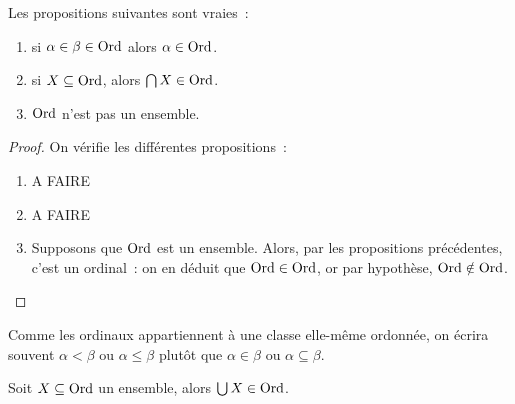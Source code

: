 \begin{proposition}
  Les propositions suivantes sont vraies~:
  \begin{enumerate}
  \item si $\alpha \in \beta \in \operatorname{Ord}$ alors $\alpha \in \operatorname{Ord}$.
  \item si $X\subseteq \operatorname{Ord}$, alors $\bigcap X \in \operatorname{Ord}$.
  \item $\operatorname{Ord}$ n'est pas un ensemble.
  \end{enumerate}
\end{proposition}

\begin{proof}
  On vérifie les différentes propositions~:
  \begin{enumerate}
  \item A FAIRE
  \item A FAIRE
  \item Supposons que $\operatorname{Ord}$ est un ensemble. Alors, par les propositions
    précédentes, c'est un ordinal~: on en déduit que $\operatorname{Ord}\in\operatorname{Ord}$, or par
    hypothèse, $\operatorname{Ord}\notin\operatorname{Ord}$.
  \end{enumerate}
\end{proof}

\begin{notation}
  Comme les ordinaux appartiennent à une classe elle-même ordonnée, on écrira
  souvent $\alpha < \beta$ ou $\alpha \leq \beta$ plutôt que $\alpha \in \beta$
  ou $\alpha \subseteq \beta$.
\end{notation}

\begin{property}
  Soit $X\subseteq\operatorname{Ord}$ un ensemble, alors $\bigcup X \in \operatorname{Ord}$.
\end{property}

